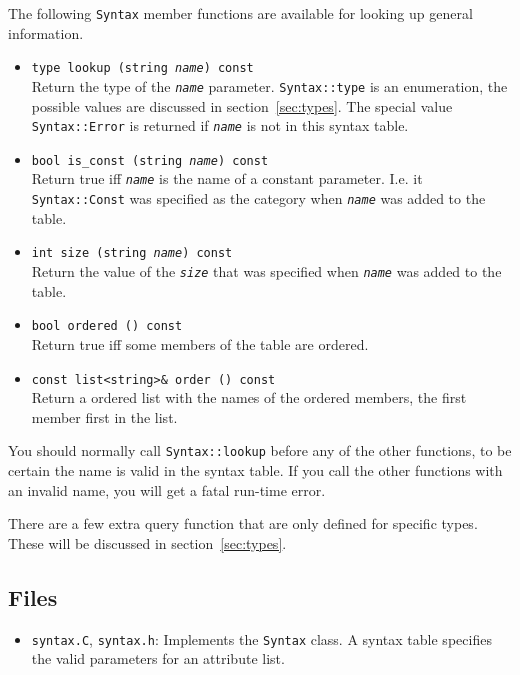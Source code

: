 \documentclass{article}
\newcommand{\code}[1]{\texttt{#1}}
\newcommand{\file}[1]{\texttt{#1}}
\begin{document}
The following \code{Syntax} member functions are available for looking
up general information.
\begin{itemize}
\item \code{type lookup (string \textit{name}) const}\\
  Return the type of the \texttt{\textit{name}} parameter.
  \code{Syntax::type} is an enumeration, the possible values are
  discussed in section~\ref{sec:types}.  The special value
  \code{Syntax::Error} is returned if \texttt{\textit{name}} is not in
  this syntax table.
\item \code{bool is\_const (string \textit{name}) const}\\
  Return true iff \texttt{\textit{name}} is the name of a constant
  parameter. I.e. it \code{Syntax::Const} was specified as the
  category when \texttt{\textit{name}} was added to the table.
\item \code{int size (string \textit{name}) const}\\
  Return the value of the \texttt{\textit{size}} that was specified
  when \texttt{\textit{name}} was added to the table.
\item \code{bool ordered () const}\\
  Return true iff some members of the table are ordered.
\item \code{const list<string>\& order () const}\\
  Return a ordered list with the names of the ordered members, the
  first member first in the list.
\end{itemize}

You should normally call \code{Syntax::lookup} before any of the other
functions, to be certain the name is valid in the syntax table.  If
you call the other functions with an invalid name, you will get a
fatal run-time error.

There are a few extra query function that are only defined for
specific types.  These will be discussed in section~\ref{sec:types}. 

\subsection{Files}

\begin{itemize}
\item \file{syntax.C}, \file{syntax.h}: Implements the
  \code{Syntax} class.  A syntax table specifies the valid parameters
  for an attribute list. 
\end{itemize}
\end{document}
